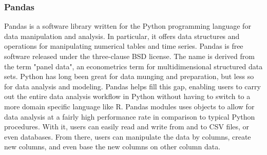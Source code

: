 \subsubsection{Pandas}
Pandas is a software library written for the Python programming language for data manipulation and analysis. In particular, it offers data structures and operations for manipulating numerical tables and time series. Pandas is free software released under the three-clause BSD license. The name is derived from the term "panel data", an econometrics term for multidimensional structured data sets. Python has long been great for data munging and preparation, but less so for data analysis and modeling. Pandas helps fill this gap, enabling users to carry out the entire data analysis workflow in Python without having to switch to a more domain specific language like R. Pandas modules uses objects to allow for data analysis at a fairly high performance rate in comparison to typical Python procedures. With it, users can easily read and write from and to CSV files, or even databases. From there, users can manipulate the data by columns, create new columns, and even base the new columns on other column data.

